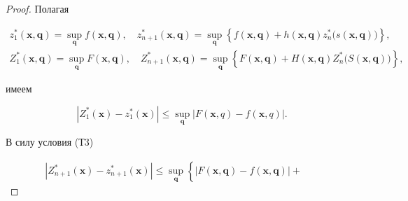\begin{proof} Полагая

\begin{gather*}

z_1^\ast (\boldsymbol x, \boldsymbol q)=\sup \limits_{\boldsymbol q} f(\boldsymbol x, \boldsymbol q),

\quad

z_{n+1}^\ast (\boldsymbol x, \boldsymbol q)=\sup \limits_{\boldsymbol q} \left\{ 

f(\boldsymbol x, \boldsymbol q)+h(\boldsymbol x, \boldsymbol q)z_n^\ast \bigl(s(\boldsymbol x, \boldsymbol q)\bigr)

\right\}, \\

Z_1^\ast (\boldsymbol x, \boldsymbol q)=\sup \limits_{\boldsymbol q} F(\boldsymbol x, \boldsymbol q),\quad

Z_{n+1}^\ast (\boldsymbol x, \boldsymbol q)=\sup \limits_{\boldsymbol q} \left\{ 

F(\boldsymbol x, \boldsymbol q)+H(\boldsymbol x, \boldsymbol q)Z_n^\ast \bigl(S(\boldsymbol x, \boldsymbol q)\bigr)

\right\},

\end{gather*}

имеем

\begin{equation}

\label{eq3}

\left| {Z_1^\ast ({{\boldsymbol x}})-z_1^\ast ({{\boldsymbol x}})} \right|\leqslant 

\mathop {\sup }\limits_{{\boldsymbol q}} \left| {F({{\boldsymbol x,q}})-f({{\boldsymbol 

x,q}})} \right|.

\end{equation}



В силу условия (Т3)



\begin{multline}

\label{eq4}

| Z_{n+1}^\ast (\boldsymbol x)-z_{n+1}^\ast (\boldsymbol x)|\leqslant

\sup \limits_{\boldsymbol q} \left\{ 

\left|F(\boldsymbol x, \boldsymbol q)-f(\boldsymbol x, \boldsymbol q) \right|+\phantom{\inf \limits_{\boldsymbol q}}

\right.


\end{multline}
\end{proof}
